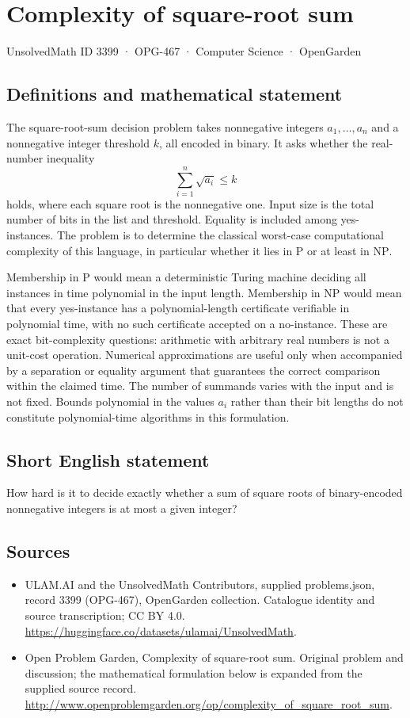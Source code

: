 \documentclass[11pt,a4paper]{article}
\begin{document}
\section*{Complexity of square-root sum}\label{3399}
{\small UnsolvedMath ID 3399 · OPG-467 · Computer Science · OpenGarden}
\subsection{Definitions and mathematical statement}
The square-root-sum decision problem takes nonnegative integers
$a_1,\ldots,a_n$ and a nonnegative integer threshold $k$, all encoded
in binary. It asks whether the real-number inequality
\[
                            \sum_{i=1}^n\sqrt{a_i}\le k
\]
holds, where each square root is the nonnegative one. Input size is
the total number of bits in the list and threshold. Equality is
included among yes-instances. The problem is to determine the
classical worst-case computational complexity of this language,
in particular whether it lies in $\mathrm P$ or at least in
$\mathrm{NP}$.

Membership in $\mathrm P$ would mean a deterministic Turing machine
deciding all instances in time polynomial in the input length.
Membership in $\mathrm{NP}$ would mean that every yes-instance has
a polynomial-length certificate verifiable in polynomial time, with
no such certificate accepted on a no-instance.
These are exact bit-complexity questions: arithmetic with arbitrary
real numbers is not a unit-cost operation. Numerical approximations
are useful only when accompanied by a separation or equality argument
that guarantees the correct comparison within the claimed time.
The number of summands varies with the input and is not fixed.
Bounds polynomial in the values $a_i$ rather than their bit lengths
do not constitute polynomial-time algorithms in this formulation.
\subsection{Short English statement}
How hard is it to decide exactly whether a sum of square roots of binary-encoded nonnegative integers is at most a given integer?
\subsection{Sources}
\begin{itemize}
\item[S1] ULAM.AI and the UnsolvedMath Contributors, supplied problems.json, record 3399 (OPG-467), OpenGarden collection. Catalogue identity and source transcription; CC BY 4.0.
\url{https://huggingface.co/datasets/ulamai/UnsolvedMath}.
\item[S2] Open Problem Garden, Complexity of square-root sum. Original problem and discussion; the mathematical formulation below is expanded from the supplied source record.
\url{http://www.openproblemgarden.org/op/complexity_of_square_root_sum}.
\end{itemize}
\end{document}
